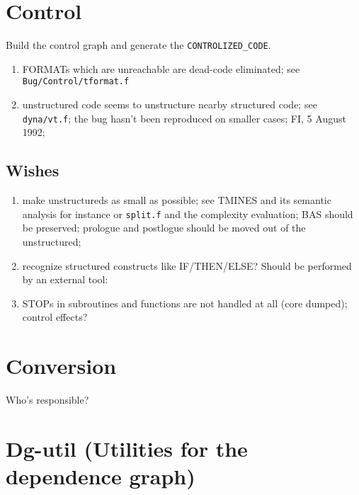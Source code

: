 \section{Control}

Build the control graph and generate the \verb+CONTROLIZED_CODE+.

\begin{enumerate}

  \item FORMATs which are unreachable are dead-code eliminated;
        see \verb+Bug/Control/tformat.f+

  \item unstructured code seems to unstructure nearby structured code;
        see \verb+dyna/vt.f+; the bug hasn't been reproduced
        on smaller cases; FI, 5 August 1992;

\end{enumerate}

\subsection{Wishes}

\begin{enumerate}

  \item {} make unstructureds as small as possible;
        see TMINES and its semantic analysis for instance or \verb+split.f+
        and the complexity evaluation; BAS should be preserved; prologue
        and postlogue should be moved out of the unstructured;

  \item recognize structured constructs like
        IF/THEN/ELSE? Should be performed by an external tool: 

  \item STOPs in subroutines and functions are not handled at 
        all (core dumped); control effects?

\end{enumerate}

\section{Conversion}

Who's responsible?

\section{Dg-util (Utilities for the dependence graph)}

